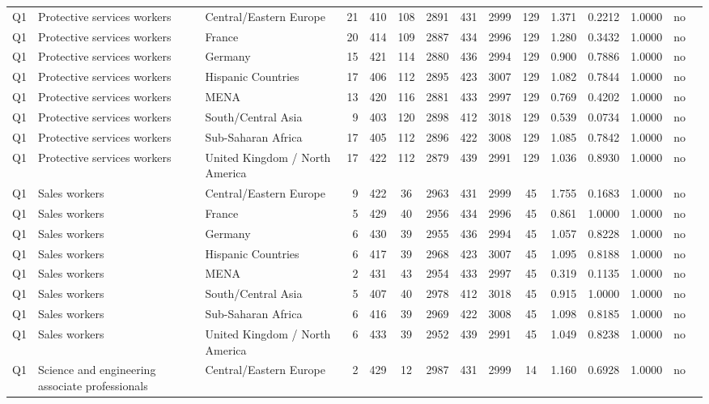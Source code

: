 \begin{longtable}{lllrcccccccccll}
Q1 & Protective services workers & Central/Eastern Europe & 21 & 410 & 108 & 2891 & 431 & 2999 & 129 & 1.371 & 0.2212 & 1.0000 & no \\
Q1 & Protective services workers & France & 20 & 414 & 109 & 2887 & 434 & 2996 & 129 & 1.280 & 0.3432 & 1.0000 & no \\
Q1 & Protective services workers & Germany & 15 & 421 & 114 & 2880 & 436 & 2994 & 129 & 0.900 & 0.7886 & 1.0000 & no \\
Q1 & Protective services workers & Hispanic Countries & 17 & 406 & 112 & 2895 & 423 & 3007 & 129 & 1.082 & 0.7844 & 1.0000 & no \\
Q1 & Protective services workers & MENA & 13 & 420 & 116 & 2881 & 433 & 2997 & 129 & 0.769 & 0.4202 & 1.0000 & no \\
Q1 & Protective services workers & South/Central Asia & 9 & 403 & 120 & 2898 & 412 & 3018 & 129 & 0.539 & 0.0734 & 1.0000 & no \\
Q1 & Protective services workers & Sub-Saharan Africa & 17 & 405 & 112 & 2896 & 422 & 3008 & 129 & 1.085 & 0.7842 & 1.0000 & no \\
Q1 & Protective services workers & United Kingdom / North America & 17 & 422 & 112 & 2879 & 439 & 2991 & 129 & 1.036 & 0.8930 & 1.0000 & no \\
Q1 & Sales workers & Central/Eastern Europe & 9 & 422 & 36 & 2963 & 431 & 2999 & 45 & 1.755 & 0.1683 & 1.0000 & no \\
Q1 & Sales workers & France & 5 & 429 & 40 & 2956 & 434 & 2996 & 45 & 0.861 & 1.0000 & 1.0000 & no \\
Q1 & Sales workers & Germany & 6 & 430 & 39 & 2955 & 436 & 2994 & 45 & 1.057 & 0.8228 & 1.0000 & no \\
Q1 & Sales workers & Hispanic Countries & 6 & 417 & 39 & 2968 & 423 & 3007 & 45 & 1.095 & 0.8188 & 1.0000 & no \\
Q1 & Sales workers & MENA & 2 & 431 & 43 & 2954 & 433 & 2997 & 45 & 0.319 & 0.1135 & 1.0000 & no \\
Q1 & Sales workers & South/Central Asia & 5 & 407 & 40 & 2978 & 412 & 3018 & 45 & 0.915 & 1.0000 & 1.0000 & no \\
Q1 & Sales workers & Sub-Saharan Africa & 6 & 416 & 39 & 2969 & 422 & 3008 & 45 & 1.098 & 0.8185 & 1.0000 & no \\
Q1 & Sales workers & United Kingdom / North America & 6 & 433 & 39 & 2952 & 439 & 2991 & 45 & 1.049 & 0.8238 & 1.0000 & no \\
Q1 & Science and engineering associate professionals & Central/Eastern Europe & 2 & 429 & 12 & 2987 & 431 & 2999 & 14 & 1.160 & 0.6928 & 1.0000 & no \\

\end{longtable}
